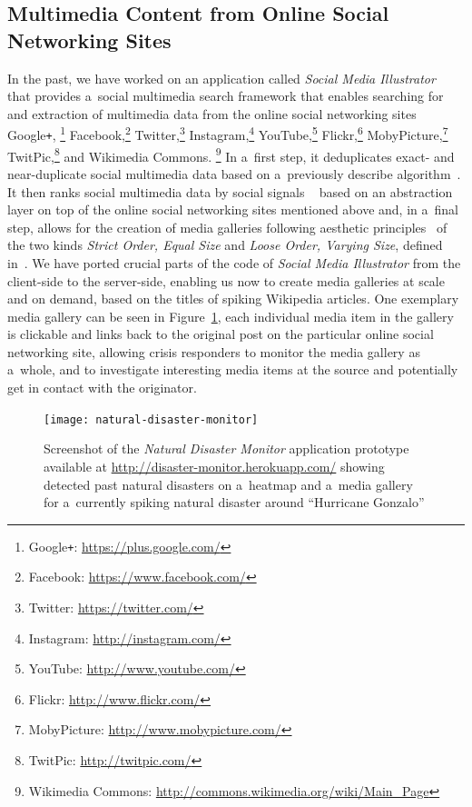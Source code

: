 \documentclass[letterpaper]{article}
\begin{document}
\subsection{Multimedia Content from Online Social Networking Sites}

In the past, we have worked on an application called
\emph{Social Media Illustrator}~\cite{steiner2014thesis}
that provides a~social multimedia search framework
that enables searching for and extraction of
multimedia data from the online social networking sites
Google\texttt{+},%
\footnote{Google\texttt{+}: \url{https://plus.google.com/}}
Facebook,\footnote{Facebook: \url{https://www.facebook.com/}}
Twitter,\footnote{Twitter: \url{https://twitter.com/}}
Instagram,\footnote{Instagram: \url{http://instagram.com/}}
YouTube,\footnote{YouTube: \url{http://www.youtube.com/}}
Flickr,\footnote{Flickr: \url{http://www.flickr.com/}}
MobyPicture,\footnote{MobyPicture: \url{http://www.mobypicture.com/}}
TwitPic,\footnote{TwitPic: \url{http://twitpic.com/}}
and Wikimedia Commons.%
\footnote{Wikimedia Commons: \url{http://commons.wikimedia.org/wiki/Main_Page}}
In a~first step, it deduplicates exact- and near-duplicate
social multimedia data based on a~previously describe algorithm~\cite{steiner2013clustering}.
It then ranks social multimedia data by social signals%
~\cite{steiner2014thesis} based on an abstraction layer
on top of the online social networking sites mentioned above
and, in a~final step, allows for the creation of media galleries
following aesthetic principles~\cite{steiner2014thesis}
of the two kinds \emph{Strict Order, Equal Size}
and \emph{Loose Order, Varying Size},
defined in~\cite{steiner2014thesis}.
We have ported crucial parts
of the code of \emph{Social Media Illustrator}
from the client-side to the server-side,
enabling us now to create media galleries at scale and on demand,
based on the titles of spiking Wikipedia articles.
One exemplary media gallery can be seen in Figure~\ref{fig:screenshot},
each individual media item in the gallery is clickable
and links back to the original post
on the particular online social networking site,
allowing crisis responders to monitor the media gallery as a~whole,
and to investigate interesting media items at the source
and potentially get in contact with the originator.

\begin{figure}[b!]
  \centering
  \texttt{[image: natural-disaster-monitor]}
  \caption{Screenshot of the \emph{Natural Disaster Monitor} application
    prototype available at \url{http://disaster-monitor.herokuapp.com/}
    showing detected past natural disasters on a~heatmap and a~media gallery for
    a~currently spiking natural disaster around ``Hurricane Gonzalo''}
  \label{fig:screenshot}
\end{figure}
\end{document}
